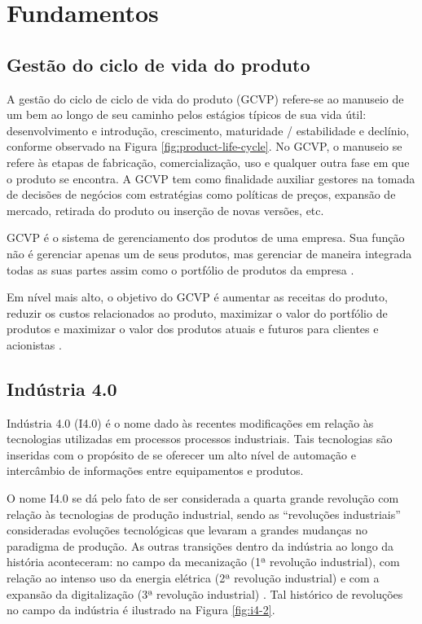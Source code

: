 \documentclass[
	12pt,				%
	oneside,			%
	a4paper,			%
	english,			%
	brazil				%
]{abntex2}
\begin{document}
\chapter{Fundamentos}

	

\section{Gestão do ciclo de vida do produto}

	A gestão do ciclo de ciclo de vida do produto (GCVP) refere-se ao manuseio de um bem ao longo de seu caminho pelos estágios típicos de sua vida útil: desenvolvimento e introdução, crescimento, maturidade / estabilidade e declínio, conforme observado na Figura \ref{fig:product-life-cycle}. No GCVP, o manuseio se refere às etapas de fabricação, comercialização, uso e qualquer outra fase em que o produto se encontra. A GCVP tem como finalidade auxiliar gestores na tomada de decisões de negócios com estratégias como políticas de preços, expansão de mercado, retirada do produto ou inserção de novas versões, etc.
	
	GCVP é o sistema de gerenciamento dos produtos de uma empresa. Sua função não é gerenciar apenas um de seus produtos, mas gerenciar de maneira integrada todas as suas partes assim como o portfólio de produtos da empresa \cite{stark2015lifecycle}.
	
	Em nível mais alto, o objetivo do GCVP é aumentar as receitas do produto, reduzir os custos relacionados ao produto, maximizar o valor do portfólio de produtos e maximizar o valor dos produtos atuais e futuros para clientes e acionistas \cite{stark2015lifecycle}.

\pagebreak
\section{Indústria 4.0}

	Indústria 4.0 (I4.0) é o nome dado às recentes modificações em relação às tecnologias utilizadas em processos processos industriais. Tais tecnologias são inseridas com o propósito de se oferecer um alto nível de automação e intercâmbio de informações entre equipamentos e produtos.

	O nome I4.0 se dá pelo fato de ser considerada a quarta grande revolução com relação às tecnologias de produção industrial, sendo as ``revoluções industriais'' consideradas evoluções tecnológicas que levaram a grandes mudanças no paradigma de produção. As outras transições dentro da indústria ao longo da história aconteceram: no campo da mecanização (1ª revolução industrial), com relação ao intenso uso da energia elétrica (2ª revolução industrial) e com a expansão da digitalização (3ª revolução industrial) \cite{lasi2014industryfour}. Tal histórico de revoluções no campo da indústria é ilustrado na Figura \ref{fig:i4-2}.
\end{document}
